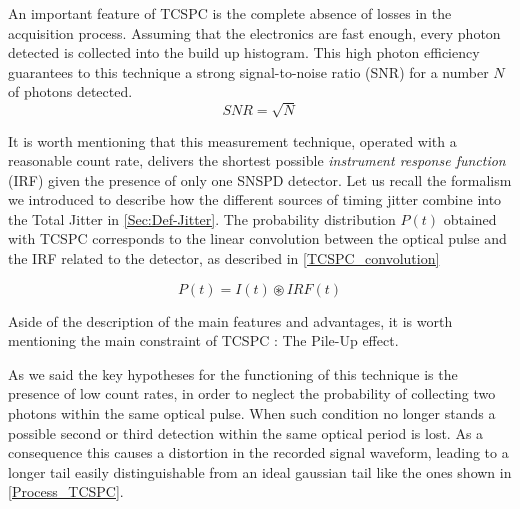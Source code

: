 An important feature of TCSPC is the complete absence of losses in the acquisition process. Assuming that the electronics are fast enough, every photon detected is collected into the build up histogram. This high photon efficiency guarantees to this technique a strong signal-to-noise ratio (SNR) for a number $N$ of photons detected.
\begin{equation}
SNR = \sqrt{N}
\end{equation}

It is worth mentioning that this measurement technique, operated with a reasonable count rate, delivers the shortest possible \emph{instrument response function} (IRF) given the presence of only one SNSPD detector.
Let us recall the formalism we introduced to describe how the different sources of timing jitter combine into the Total Jitter in \autoref{Sec:Def-Jitter}.
The probability distribution $P(t)$ obtained with TCSPC corresponds to the linear convolution between the optical pulse and the IRF related to the detector, as described in \autoref{TCSPC_convolution}

\begin{equation}
    P(t) = I(t) \circledast IRF(t)
\label{TCSPC_convolution}
\end{equation}
 
Aside of the description of the main features and advantages, it is worth mentioning the main constraint of TCSPC : The Pile-Up effect.

As we said the key hypotheses for the functioning of this technique is the presence of low count rates, in order to neglect the probability of collecting two photons within the same optical pulse.
When such condition no longer stands a possible second or third detection within the same optical period is lost.
As a consequence this causes a distortion in the recorded signal waveform, leading to a longer tail easily distinguishable from an ideal gaussian tail like the ones shown in \autoref{Process_TCSPC}.





